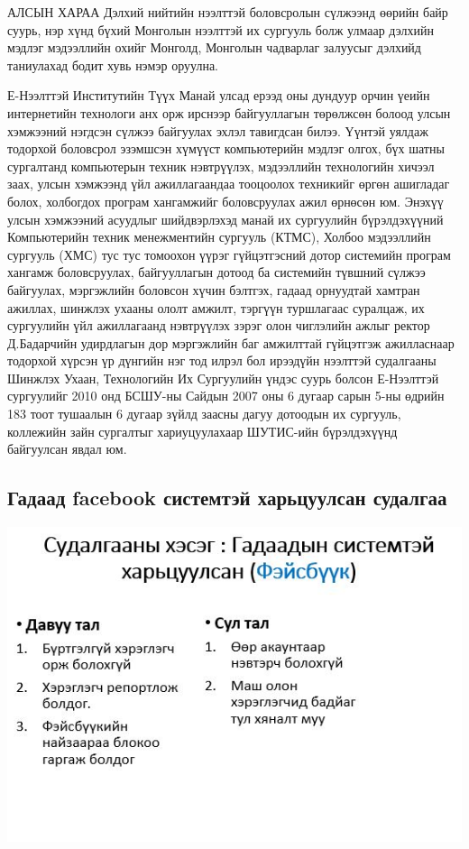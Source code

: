 \documentclass[
oneside, %
english, %
onehalfspacing, %
nolistspacing, %
headsepline, %
]{article} %
\begin{document}
    АЛСЫН ХАРАА
        Дэлхий нийтийн нээлттэй боловсролын сүлжээнд өөрийн байр суурь, нэр хүнд бүхий Монголын нээлттэй их сургууль болж улмаар дэлхийн мэдлэг мэдээллийн охийг Монголд, Монголын чадварлаг залуусыг дэлхийд таниулахад бодит хувь нэмэр оруулна.
        
    
    Е-Нээлттэй Институтийн Түүх
       Манай улсад ерээд оны дундуур орчин үеийн интернетийн технологи анх орж ирснээр байгууллагын төрөлжсөн болоод улсын хэмжээний нэгдсэн сүлжээ байгуулах эхлэл тавигдсан билээ. Үүнтэй уялдаж тодорхой боловсрол эзэмшсэн хүмүүст компьютерийн мэдлэг олгох, бүх шатны сургалтанд компьютерын техник нэвтрүүлэх, мэдээллийн технологийн хичээл заах, улсын хэмжээнд үйл ажиллагаандаа тооцоолох техникийг өргөн ашигладаг болох, холбогдох програм хангамжийг боловсруулах ажил өрнөсөн юм. Энэхүү улсын хэмжээний асуудлыг шийдвэрлэхэд манай их сургуулийн бүрэлдэхүүний Компьютерийн техник менежментийн сургууль (КТМС), Холбоо мэдээллийн сургууль (ХМС) тус тус томоохон үүрэг гүйцэтгэсний дотор системийн програм хангамж боловсруулах, байгууллагын дотоод ба системийн түвшний сүлжээ байгуулах, мэргэжлийн боловсон хүчин бэлтгэх, гадаад орнуудтай хамтран ажиллах, шинжлэх ухааны ололт амжилт, тэргүүн туршлагаас суралцаж, их сургуулийн үйл ажиллагаанд нэвтрүүлэх зэрэг олон чиглэлийн ажлыг ректор Д.Бадарчийн удирдлагын дор мэргэжлийн баг амжилттай гүйцэтгэж ажилласнаар тодорхой хүрсэн үр дүнгийн нэг тод илрэл бол ирээдүйн нээлттэй судалгааны Шинжлэх Ухаан, Технологийн Их Сургуулийн үндэс суурь болсон Е-Нээлттэй сургуулийг 2010 онд БСШУ-ны Сайдын 2007 оны 6 дугаар сарын 5-ны өдрийн 183 тоот тушаалын 6 дугаар зүйлд заасны дагуу дотоодын их сургууль, коллежийн зайн сургалтыг хариуцуулахаар ШУТИС-ийн бүрэлдэхүүнд байгуулсан явдал юм.
	\subsection{Гадаад facebook системтэй харьцуулсан судалгаа}
	
	\includegraphics[width=\textwidth]{gadaadsudalgaa}
\end{document}
